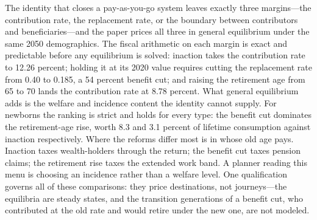 \documentclass[12pt,a4paper]{article}
\begin{document}
The identity that closes a pay-as-you-go system leaves exactly three margins---the contribution rate, the replacement rate, or the boundary between contributors and beneficiaries---and the paper prices all three in general equilibrium under the same 2050 demographics. The fiscal arithmetic on each margin is exact and predictable before any equilibrium is solved: inaction takes the contribution rate to 12.26 percent; holding it at its 2020 value requires cutting the replacement rate from 0.40 to 0.185, a 54 percent benefit cut; and raising the retirement age from 65 to 70 lands the contribution rate at 8.78 percent. What general equilibrium adds is the welfare and incidence content the identity cannot supply. For newborns the ranking is strict and holds for every type: the benefit cut dominates the retirement-age rise, worth 8.3 and 3.1 percent of lifetime consumption against inaction respectively. Where the reforms differ most is in whose old age pays. Inaction taxes wealth-holders through the return; the benefit cut taxes pension claims; the retirement rise taxes the extended work band. A planner reading this menu is choosing an incidence rather than a welfare level. One qualification governs all of these comparisons: they price destinations, not journeys---the equilibria are steady states, and the transition generations of a benefit cut, who contributed at the old rate and would retire under the new one, are not modeled.
\end{document}
